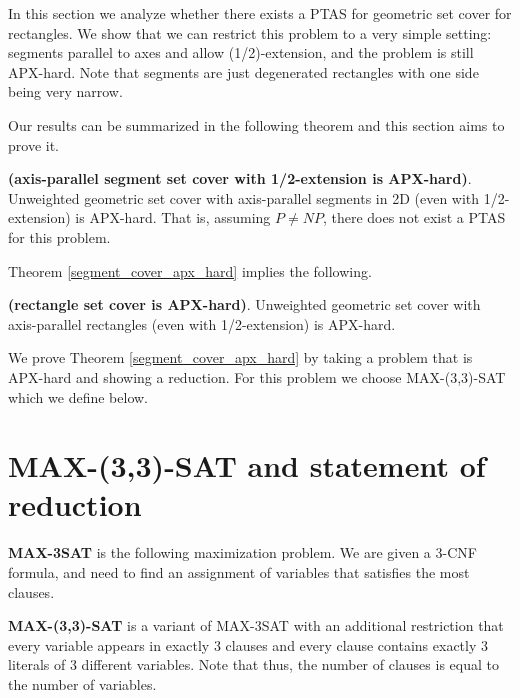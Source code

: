 \newcommand{\setCoverInstance}{(\points, \sets)}
\newcommand{\true}{\texttt{true}}
\newcommand{\false}{\texttt{false}}

\label{chapter:segment_apx}

In this section we analyze whether there exists 
a PTAS for geometric set cover for rectangles.
We show that we can restrict this problem
to a very simple setting:
segments parallel to axes and allow (1/2)-extension,
and the problem is still APX-hard.
Note that segments are just degenerated rectangles
with one side being very narrow.


Our results can be summarized in the following
theorem and this section aims to prove it.

\begin{tw}{
\label{segment_cover_apx_hard}
	\textbf{(axis-parallel segment set cover with 1/2-extension is APX-hard)}.	
	Unweighted geometric set cover
	with axis-parallel segments in 2D (even with 1/2-extension)
	is APX-hard.
	That is, assuming $P\neq NP$, there does not exist a PTAS
	for this problem.
}\end{tw}
 
Theorem \ref{segment_cover_apx_hard} implies the following.

\begin{corollary}{
\label{rectangle_cover_apx_hard}
	\textbf{(rectangle set cover is APX-hard)}.	
	Unweighted geometric set cover
	with axis-parallel rectangles (even with 1/2-extension) is APX-hard.
}\end{corollary}


We prove Theorem \ref{segment_cover_apx_hard}
by taking a problem that is APX-hard
and showing a reduction.
For this problem we choose
MAX-(3,3)-SAT which we define below.


\section{MAX-(3,3)-SAT and statement of reduction}
\begin{defi}
\textbf{MAX-3SAT} is the following maximization problem. We are given a 3-CNF
formula, and need to find an assignment of variables
that satisfies the most clauses.
\end{defi}

\begin{defi}
\textbf{MAX-(3,3)-SAT} is a variant of MAX-3SAT with an additional
restriction that every variable appears in exactly 3 clauses
and every clause contains exactly 3 literals of 3 different variables.
Note that thus, the number of clauses is equal to the number of variables.
\end{defi}

